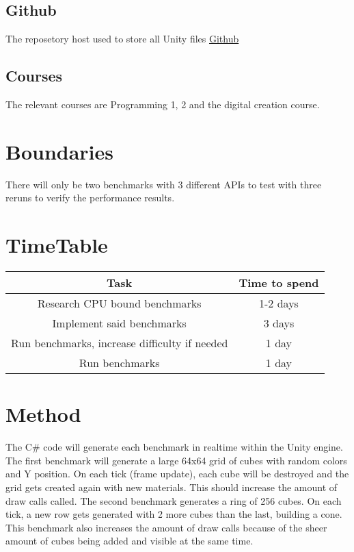 \documentclass{article}
\begin{document}
\subsection* {Github}
The reposetory host used to store all Unity files
\newline\href{https://github.com}{Github}

\subsection* {Courses}
The relevant courses are Programming 1, 2 and the digital creation course.


\section {Boundaries}
There will only be two benchmarks with 3 different APIs to test with three reruns to verify the performance results.

\section {TimeTable}
\begin{center}
\begin{tabular}{ |c|c| }
\hline
\textbf {Task} & \textbf {Time to spend} \\
\hline
Research CPU bound benchmarks & 1-2 days \\
\hline
Implement said benchmarks & 3 days \\
\hline
Run benchmarks, increase difficulty if needed & 1 day \\
\hline
Run benchmarks & 1 day \\
\hline
\end{tabular}
\end{center}


\section {Method}
The C\# code will generate each benchmark in realtime within the Unity engine. The first benchmark will generate a large 64x64 grid of cubes with random colors and Y position. On each tick (frame update), each cube will be destroyed and the grid gets created again with new materials. This should increase the amount of draw calls called. The second benchmark generates a ring of 256 cubes. On each tick, a new row gets generated with 2 more cubes than the last, building a cone. This benchmark also increases the amount of draw calls because of the sheer amount of cubes being added and visible at the same time.\par
\end{document}
